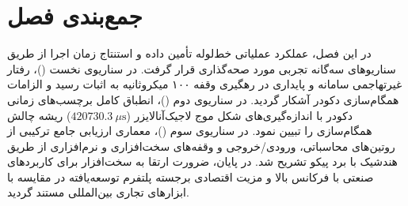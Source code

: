 \section{جمع‌بندی فصل}
\label{sec:evaluation_summary}
در این فصل، عملکرد عملیاتی خط‌لوله تأمین داده و استنتاج زمان اجرا از طریق سناریوهای سه‌گانه تجربی مورد صحه‌گذاری قرار گرفت. در سناریوی نخست ()، رفتار غیرتهاجمی سامانه و پایداری در رهگیری وقفه ۱۰۰ میکروثانیه به اثبات رسید و الزامات همگام‌سازی دکودر آشکار گردید. در سناریوی دوم ()، انطباق کامل برچسب‌های زمانی دکودر با اندازه‌گیری‌های شکل موج لاجیک‌آنالایزر ($420730.3\ \mu\mathrm{s}$) ریشه چالش همگام‌سازی را تبیین نمود. در سناریوی سوم ()، معماری ارزیابی جامع ترکیبی از روتین‌های محاسباتی، ورودی/خروجی و وقفه‌های سخت‌افزاری و نرم‌افزاری از طریق هندشیک با برد پیکو تشریح شد. در پایان، ضرورت ارتقا به سخت‌افزار  برای کاربردهای صنعتی با فرکانس بالا و مزیت اقتصادی برجسته پلتفرم توسعه‌یافته در مقایسه با ابزارهای تجاری بین‌المللی مستند گردید.
